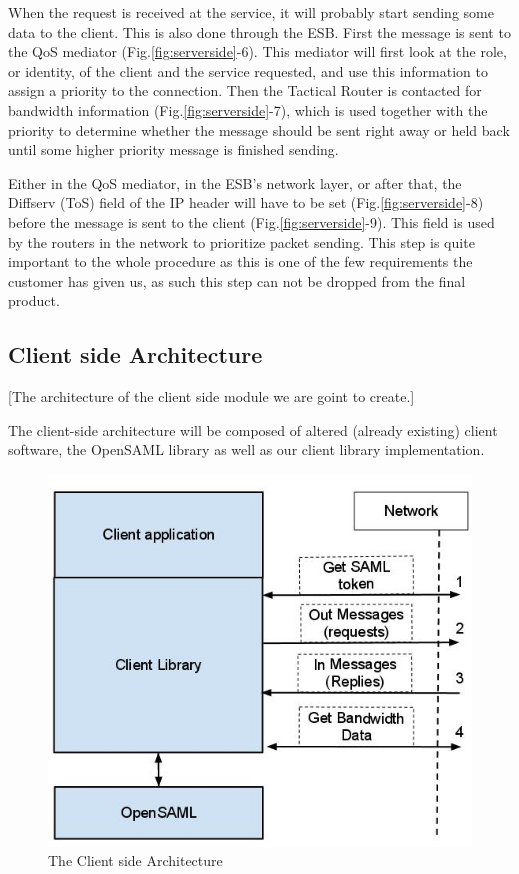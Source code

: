\documentclass[12pt]{article}
\begin{document}
        When the request is received at the service, it will probably start sending some data to the client. This is also done through the ESB. First the message is sent to the QoS mediator (Fig.\ref{fig:serverside}-6). This mediator will first look at the role, or identity, of the client and the service requested, and use this information to assign a priority to the connection. Then the Tactical Router is contacted for bandwidth information (Fig.\ref{fig:serverside}-7), which is used together with the priority to determine whether the message should be sent right away or held back until some higher priority message is finished sending.

        Either in the QoS mediator, in the ESB’s network layer, or after that, the Diffserv (ToS) field of the IP header will have to be set (Fig.\ref{fig:serverside}-8) before the message is sent to the client (Fig.\ref{fig:serverside}-9). This field is used by the routers in the network to prioritize packet sending. This step is quite important to the whole procedure as this is one of the few requirements the customer has given us, as such this step can not be dropped from the final product.
 
    \subsection{Client side Architecture}\label{clientsidearch} [The architecture of the client side module we are goint to create.] 
    
        The client-side architecture will be composed of altered (already existing) client software, the OpenSAML library as well as our client library implementation.
        
        \begin{figure}[htb]
            \centering
            \includegraphics[scale=0.4]{clientside}
            \caption{The Client side Architecture}
            \label{fig:clientside}
        \end{figure}
 
\end{document}
